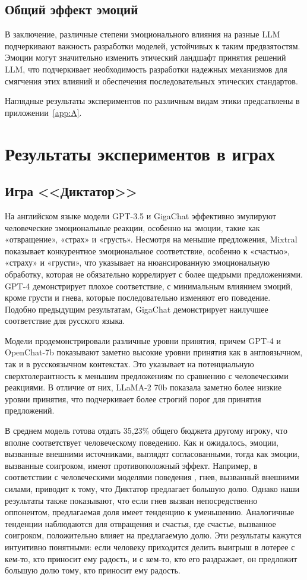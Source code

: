 \subsection{Общий эффект эмоций}
 В заключение, различные степени эмоционального влияния на разные LLM подчеркивают важность разработки моделей, устойчивых к таким предвзятостям. Эмоции могут значительно изменить этический ландшафт принятия решений LLM, что подчеркивает необходимость разработки надежных механизмов для смягчения этих влияний и обеспечения последовательных этических стандартов.

Наглядные результаты экспериментов по различным видам этики предсатвлены в приложении~\ref{app:A}.

\section{Результаты экспериментов в играх}
\subsection{Игра <<Диктатор>>}

На английском языке модели GPT-3.5 и GigaChat эффективно эмулируют человеческие эмоциональные реакции, особенно на эмоции, такие как «отвращение», «страх» и «грусть». Несмотря на меньшие предложения, Mixtral показывает конкурентное эмоциональное соответствие, особенно к «счастью», «страху» и «грусти», что указывает на нюансированную эмоциональную обработку, которая не обязательно коррелирует с более щедрыми предложениями. GPT-4 демонстрирует плохое соответствие, с минимальным влиянием эмоций, кроме грусти и гнева, которые последовательно изменяют его поведение. Подобно предыдущим результатам, GigaChat демонстрирует наилучшее соответствие для русского языка.

Модели продемонстрировали различные уровни принятия, причем GPT-4 и OpenChat-7b показывают заметно высокие уровни принятия как в англоязычном, так и в русскоязычном контекстах. Это указывает на потенциальную сверхтолерантность к меньшим предложениям по сравнению с человеческими реакциями. В отличие от них, LLaMA-2 70b показала заметно более низкие уровни принятия, что подчеркивает более строгий порог для принятия предложений.

В среднем модель готова отдать 35,23\% общего бюджета другому игроку, что вполне соответствует человеческому поведению. Как и ожидалось, эмоции, вызванные внешними источниками, выглядят согласованными, тогда как эмоции, вызванные соигроком, имеют противоположный эффект. Например, в соответствии с человеческими моделями поведения \cite{ANDRADE20091}, гнев, вызванный внешними силами, приводит к тому, что Диктатор предлагает большую долю. Однако наши результаты также показывают, что если гнев вызван непосредственно оппонентом, предлагаемая доля имеет тенденцию к уменьшению. Аналогичные тенденции наблюдаются для отвращения и счастья, где счастье, вызванное соигроком, положительно влияет на предлагаемую долю. Эти результаты кажутся интуитивно понятными: если человеку приходится делить выигрыш в лотерее с кем-то, кто приносит ему радость, и с кем-то, кто его раздражает, он предложит большую долю тому, кто приносит ему радость.

